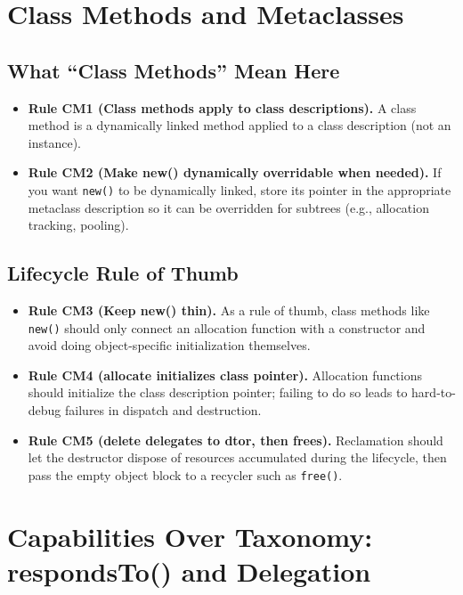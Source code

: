 \documentclass[11pt]{article}
\begin{document}
\section{Class Methods and Metaclasses}

\subsection{What ``Class Methods'' Mean Here}

\begin{itemize}
  \item \textbf{Rule CM1 (Class methods apply to class descriptions).} A class method is a dynamically linked method applied to a class description (not an instance).
  \item \textbf{Rule CM2 (Make new() dynamically overridable when needed).} If you want \texttt{new()} to be dynamically linked, store its pointer in the appropriate metaclass description so it can be overridden for subtrees (e.g., allocation tracking, pooling).
\end{itemize}

\subsection{Lifecycle Rule of Thumb}

\begin{itemize}
  \item \textbf{Rule CM3 (Keep new() thin).} As a rule of thumb, class methods like \texttt{new()} should only connect an allocation function with a constructor and avoid doing object-specific initialization themselves.
  \item \textbf{Rule CM4 (allocate initializes class pointer).} Allocation functions should initialize the class description pointer; failing to do so leads to hard-to-debug failures in dispatch and destruction.
  \item \textbf{Rule CM5 (delete delegates to dtor, then frees).} Reclamation should let the destructor dispose of resources accumulated during the lifecycle, then pass the empty object block to a recycler such as \texttt{free()}.
\end{itemize}

\section{Capabilities Over Taxonomy: respondsTo() and Delegation}
\end{document}
